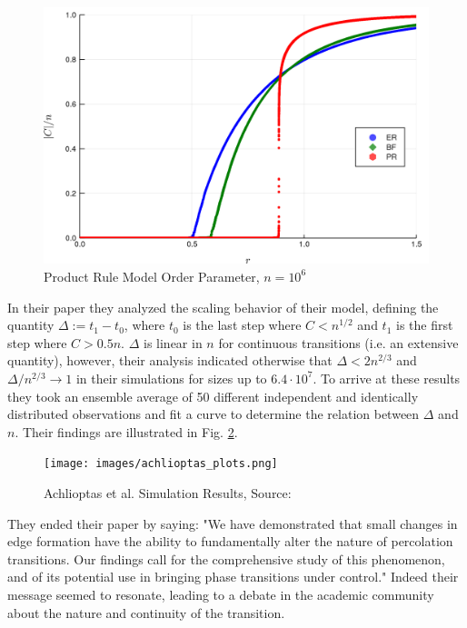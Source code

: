 \begin{figure}[H]
	\centering
	\includegraphics[width=350pt]{images/ER_BF_PR_1e6_order_param.png}
	\caption{Product Rule Model Order Parameter, $n = 10^6$}
	\label{fig:ER_BF_PR_transition}
\end{figure}

In their paper they analyzed the scaling behavior of their model, defining the quantity $\Delta := t_1 - t_0$, where $t_0$ is the last step where $C < n^{1/2}$ and $t_1$ is the first step where $C > 0.5n$.
$\Delta$ is linear in $n$ for continuous transitions (i.e. an extensive quantity), however, their analysis indicated otherwise that $\Delta < 2n^{2/3}$ and $\Delta / n^{2/3} \rightarrow 1$ in their simulations for sizes up to $6.4 \cdot 10^7$.
To arrive at these results they took an ensemble average of 50 different independent and identically distributed observations and fit a curve to determine the relation between $\Delta$ and $n$.
Their findings are illustrated in Fig. \ref{fig:achlioptas_plots}.
\cite{Achlioptas}

\begin{figure}[H]
	\centering
	\texttt{[image: images/achlioptas\_plots.png]}
	\caption{Achlioptas et al. Simulation Results, Source: \cite{Achlioptas}}
	\label{fig:achlioptas_plots}
\end{figure}

They ended their paper by saying: "We have demonstrated that small changes in edge formation have the ability to fundamentally alter the nature of percolation transitions. Our findings call for the comprehensive study of this phenomenon, and of its potential use in bringing phase transitions under control."
Indeed their message seemed to resonate, leading to a debate in the academic community about the nature and continuity of the transition.



\subsubsection{}
